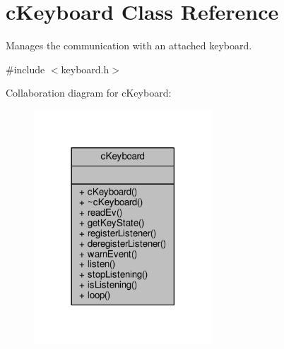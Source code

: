 \hypertarget{classc_keyboard}{}\section{c\+Keyboard Class Reference}
\label{classc_keyboard}


Manages the communication with an attached keyboard.  




{\ttfamily \#include $<$keyboard.\+h$>$}



Collaboration diagram for c\+Keyboard\+:
\nopagebreak
\begin{figure}[H]
\begin{center}
\leavevmode
\includegraphics[width=189pt]{classc_keyboard__coll__graph}
\end{center}
\end{figure}
